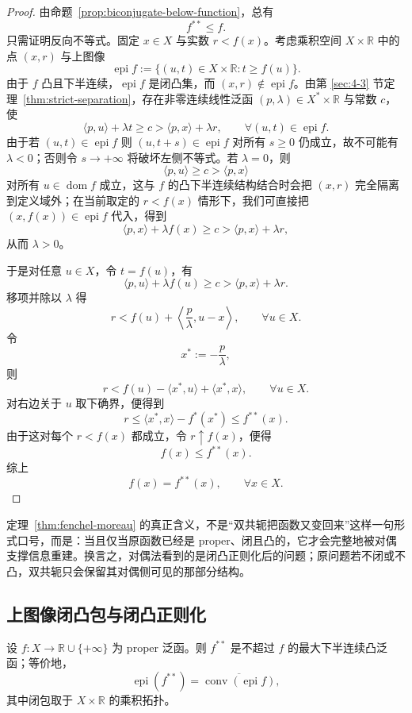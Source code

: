 \begin{proof}
由命题~\ref{prop:biconjugate-below-function}，总有
\[
f^{\ast\ast}\le f.
\]
只需证明反向不等式。固定 $x\in X$ 与实数 $r<f(x)$。考虑乘积空间 $X\times \mathbb R$ 中的点 $(x,r)$ 与上图像
\[
\operatorname{epi}f:=\{(u,t)\in X\times \mathbb R:t\ge f(u)\}.
\]
由于 $f$ 凸且下半连续，$\operatorname{epi}f$ 是闭凸集，而 $(x,r)\notin \operatorname{epi}f$。由第 \ref{sec:4-3} 节定理~\ref{thm:strict-separation}，存在非零连续线性泛函 $(p,\lambda)\in X^\ast\times \mathbb R$ 与常数 $c$，使
\[
\langle p,u\rangle+\lambda t\ge c>\langle p,x\rangle+\lambda r,
\qquad \forall (u,t)\in \operatorname{epi}f.
\]
由于若 $(u,t)\in \operatorname{epi}f$ 则 $(u,t+s)\in \operatorname{epi}f$ 对所有 $s\ge 0$ 仍成立，故不可能有 $\lambda<0$；否则令 $s\to+\infty$ 将破坏左侧不等式。若 $\lambda=0$，则
\[
\langle p,u\rangle\ge c>\langle p,x\rangle
\]
对所有 $u\in \operatorname{dom}f$ 成立，这与 $f$ 的凸下半连续结构结合时会把 $(x,r)$ 完全隔离到定义域外；在当前取定的 $r<f(x)$ 情形下，我们可直接把 $(x,f(x))\in\operatorname{epi}f$ 代入，得到
\[
\langle p,x\rangle+\lambda f(x)\ge c>\langle p,x\rangle+\lambda r,
\]
从而 $\lambda>0$。

于是对任意 $u\in X$，令 $t=f(u)$，有
\[
\langle p,u\rangle+\lambda f(u)\ge c>\langle p,x\rangle+\lambda r.
\]
移项并除以 $\lambda$ 得
\[
r<f(u)+\left\langle \frac{p}{\lambda},u-x\right\rangle,\qquad \forall u\in X.
\]
令
\[
x^\ast:=-\frac{p}{\lambda},
\]
则
\[
r< f(u)-\langle x^\ast,u\rangle+\langle x^\ast,x\rangle,\qquad \forall u\in X.
\]
对右边关于 $u$ 取下确界，便得到
\[
r\le \langle x^\ast,x\rangle-f^\ast(x^\ast)\le f^{\ast\ast}(x).
\]
由于这对每个 $r<f(x)$ 都成立，令 $r\uparrow f(x)$，便得
\[
f(x)\le f^{\ast\ast}(x).
\]
综上
\[
f(x)=f^{\ast\ast}(x),\qquad \forall x\in X.
\]
\end{proof}

\begin{remark}
定理~\ref{thm:fenchel-moreau} 的真正含义，不是“双共轭把函数又变回来”这样一句形式口号，而是：当且仅当原函数已经是 proper、闭且凸的，它才会完整地被对偶支撑信息重建。换言之，对偶法看到的是闭凸正则化后的问题；原问题若不闭或不凸，双共轭只会保留其对偶侧可见的那部分结构。
\end{remark}

\subsection{上图像闭凸包与闭凸正则化}

\begin{proposition}[双共轭的上图像闭凸包表述]\label{prop:epigraph-biconjugate-closure}
设 $f\colon X\to \mathbb R\cup\{+\infty\}$ 为 proper 泛函。则 $f^{\ast\ast}$ 是不超过 $f$ 的最大下半连续凸泛函；等价地，
\[
\operatorname{epi}(f^{\ast\ast})=\overline{\operatorname{conv}(\operatorname{epi}f)},
\]
其中闭包取于 $X\times \mathbb R$ 的乘积拓扑。
\end{proposition}

